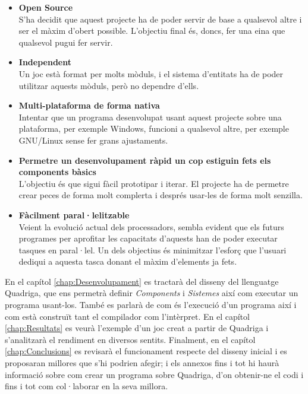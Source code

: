 \begin{itemize}
  \item {\bf Open Source} \hfill \\
    S'ha decidit que aquest projecte ha de poder servir de base a qualsevol altre i ser el màxim d'obert possible. L'objectiu final és, doncs, fer una eina que qualsevol pugui fer servir.
    
  \item {\bf Independent} \hfill \\
    Un joc està format per molts mòduls, i el sistema d'entitats ha de poder utilitzar aquests mòduls, però no dependre d'ells.
    
  \item {\bf Multi-plataforma de forma nativa} \hfill \\
    Intentar que un programa desenvolupat usant aquest projecte sobre una plataforma, per exemple Windows, funcioni a qualsevol altre, per exemple GNU/Linux sense fer grans ajustaments.
    
  \item {\bf Permetre un desenvolupament ràpid un cop estiguin fets els components bàsics} \hfill \\
    L'objectiu és que sigui fàcil prototipar i iterar. El projecte ha de permetre crear peces de forma molt complerta i després usar-les de forma molt senzilla.
    
  \item {\bf Fàcilment paral·lelitzable} \hfill \\
    Veient la evolució actual dels processadors, sembla evident que els futurs programes per aprofitar les capacitats d'aquests han de poder executar tasques en paral·lel. Un dels objectius és minimitzar l'esforç que l'usuari dediqui a aquesta tasca donant el màxim d'elements ja fets.
\end{itemize}


En el capítol \ref{chap:Desenvolupament} es tractarà del disseny del llenguatge Quadriga, que ens permetrà definir {\em Components} i {\em Sistemes} així com executar un programa usant-los. També es parlarà de com és l'execució d'un programa així i com està construït tant el compilador com l'intèrpret. En el capítol \ref{chap:Resultats} es veurà l'exemple d'un joc creat a partir de Quadriga i s'analitzarà el rendiment en diversos sentits. Finalment, en el capítol \ref{chap:Conclusions} es revisarà el funcionament respecte del disseny inicial i es proposaran millores que s'hi podrien afegir; i els annexos fins i tot hi haurà informació sobre com crear un programa sobre Quadriga, d'on obtenir-ne el codi i fins i tot com col·laborar en la seva millora.